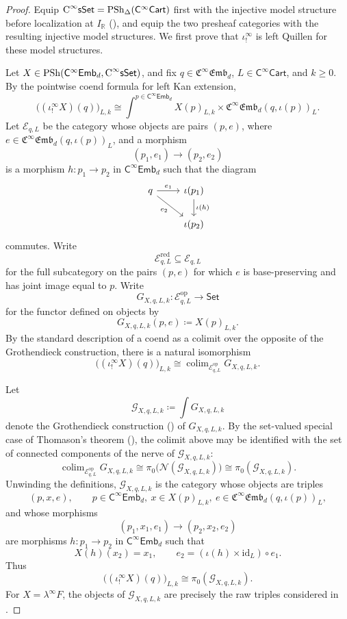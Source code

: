 \documentclass{amsart}
\newcommand{\cat}[1]{\mathsf{#1}}
\newcommand{\Set}{\cat{Set}}
\newcommand{\sset}{\cat{sSet}}
\newcommand{\nerve}{\mathcal{N}}
\newcommand{\id}{\mathrm{id}}
\DeclareMathOperator*{\colim}{colim}
\newcommand{\CsSet}{\textnormal{C}^{\infty}\sset}
\newcommand{\Cart}{\cat{C}^{\infty}\cat{Cart}}
\newcommand{\fembnoniso}[1]{\cat{C}^{\infty}\cat{Emb}_{#1}}
\newcommand{\femb}[1]{\mathfrak{C}^{\infty}\mathfrak{Emb}_{#1}}
\newcommand{\psh}{\mathrm{PSh}}
\newcommand{\spsh}{\mathrm{PSh}_{\Delta}}
\newcommand{\RR}{{\mathbb{R}}}
\renewcommand{\op}{\mathrm{op}}
\theoremstyle{definition}
\numberwithin{equation}{subsection}
\numberwithin{subsubsection}{subsection}
\begin{document}
\begin{proof}
  Equip \(\CsSet=\spsh(\Cart)\) first with the injective model
  structure before localization at \(I_{\RR}\)
  (), and equip the two presheaf
  categories with the resulting injective model structures. We first prove
  that \(\iota_{!}^{\infty}\) is left Quillen for these model structures.

  Let \(X\in \psh(\fembnoniso{d},\CsSet)\), and fix
  \(q\in \femb{d}\), \(L\in \Cart\), and \(k\geq 0\). By the pointwise coend
  formula for left Kan extension,
  \[
    \bigl((\iota_{!}^{\infty}X)(q)\bigr)_{L,k}
    \cong
    \int^{p\in \fembnoniso{d}}
    X(p)_{L,k}\times \femb{d}(q,\iota(p))_L.
  \]
  Let \(\mathcal{E}_{q,L}\) be the category whose objects are pairs
  \((p,e)\), where
  \( e\in \femb{d}(q,\iota(p))_L \), and a morphism
  \[
    (p_{1},e_{1}) \longrightarrow (p_{2}, e_{2})
  \]
  is a morphism \( h: p_1\to p_2 \) in \( \fembnoniso{d} \) such that the
  diagram
  \[
    \begin{tikzcd}
      q & {\iota(p_1)} \\
      & {\iota(p_2)}
      \arrow["{e_1}", from=1-1, to=1-2]
      \arrow["{e_2}"', from=1-1, to=2-2]
      \arrow["{\iota(h)}", from=1-2, to=2-2]
    \end{tikzcd}
  \]
  commutes. Write
  \[
    \mathcal{E}^{\mathrm{red}}_{q,L}
    \subseteq \mathcal{E}_{q,L}
  \]
  for the full subcategory on the pairs \((p,e)\) for which \(e\) is
  base-preserving and has joint image equal to \(p\). Write
  \[
    G_{X,q,L,k}: \mathcal{E}_{q,L}^{\op}\longrightarrow \Set
  \]
  for the functor defined on objects by
  \[
    G_{X,q,L,k}(p,e)\coloneqq X(p)_{L,k}.
  \]
  By the standard description of a coend as a colimit over the opposite of the
  Grothendieck construction, there is a natural isomorphism
  \[
    \bigl((\iota_{!}^{\infty}X)(q)\bigr)_{L,k}
    \cong
    \colim_{\mathcal{E}_{q,L}^{\op}} G_{X,q,L,k}.
  \]

  Let
  \[
    \mathcal{G}_{X,q,L,k}\coloneqq \int G_{X,q,L,k}
  \]
  denote the Grothendieck construction ()
  of \(G_{X,q,L,k}\). By the set-valued
  special case of Thomason's theorem (), the colimit above
  may be identified with
  the set of connected components of the nerve of \(\mathcal{G}_{X,q,L,k}\):
  \[
    \colim_{\mathcal{E}_{q,L}^{\op}} G_{X,q,L,k}
    \cong
    \pi_0\bigl(\nerve(\mathcal{G}_{X,q,L,k})\bigr)
    \cong
    \pi_0(\mathcal{G}_{X,q,L,k}).
  \]
  Unwinding the definitions, \(\mathcal{G}_{X,q,L,k}\) is the category whose
  objects are triples
  \[
    (p,x,e),
    \qquad
    p\in \fembnoniso{d},\ x\in X(p)_{L,k},\ e\in \femb{d}(q,\iota(p))_L,
  \]
  and whose morphisms
  \[
    (p_1,x_1,e_1)\longrightarrow (p_2,x_2,e_2)
  \]
  are morphisms \( h: p_1\to p_2 \) in \( \fembnoniso{d} \) such that
  \[
    X(h)(x_2)=x_1,
    \qquad
    e_2=(\iota(h)\times \id_L)\circ e_1.
  \]
  Thus
  \[
    \bigl((\iota_{!}^{\infty}X)(q)\bigr)_{L,k}
    \cong
    \pi_0(\mathcal{G}_{X,q,L,k}).
  \]
  For \(X=\lambda^\infty F\), the objects of
  \(\mathcal{G}_{X,q,L,k}\) are precisely the raw triples considered in
  .


\end{proof}
\end{document}
